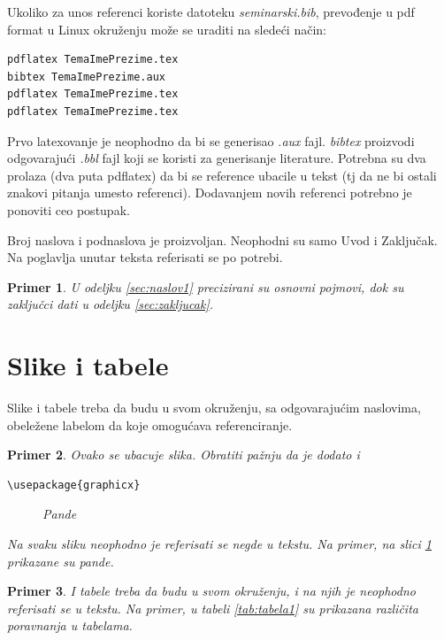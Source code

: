 \documentclass[a4paper]{article}
\newtheorem{primer}{Primer}[section]
\begin{document}
{Ukoliko za unos referenci koriste datoteku {\em seminarski.bib},  prevođenje u pdf format u Linux okruženju može se uraditi na sledeći način:
\begin{verbatim}
pdflatex TemaImePrezime.tex 
bibtex TemaImePrezime.aux 
pdflatex TemaImePrezime.tex 
pdflatex TemaImePrezime.tex 
\end{verbatim}
Prvo latexovanje je neophodno da bi se generisao {\em .aux} fajl. {\em bibtex} proizvodi odgovarajući {\em .bbl} fajl koji se koristi za generisanje literature. 
Potrebna su dva prolaza (dva puta pdflatex) da bi se reference ubacile u tekst (tj da ne bi ostali znakovi pitanja umesto referenci). Dodavanjem novih referenci potrebno je ponoviti ceo postupak.  


Broj naslova i podnaslova je proizvoljan. Neophodni su samo Uvod i Zaključak. Na poglavlja unutar teksta referisati se po potrebi. 
\begin{primer}
U odeljku \ref{sec:naslov1} precizirani su osnovni pojmovi, dok su zaključci dati u odeljku \ref{sec:zakljucak}.
\end{primer}




\section{Slike i tabele}
\label{slike_i_tabele}

Slike i tabele treba da budu u svom okruženju, sa odgovarajućim naslovima, obeležene labelom da koje omogućava referenciranje. 

\begin{primer} Ovako se ubacuje slika. Obratiti pažnju da je dodato i 
\begin{verbatim}
\usepackage{graphicx}
\end{verbatim}

\begin{figure}[h!]
\begin{center}
\end{center}
\caption{Pande}
\label{fig:pande}
\end{figure}

Na svaku sliku neophodno je referisati se negde u tekstu. Na primer, na slici \ref{fig:pande} prikazane su pande. 
\end{primer}

\begin{primer} I tabele treba da budu u svom okruženju, i na njih je neophodno referisati se u tekstu. Na primer, u tabeli \ref{tab:tabela1} su prikazana različita poravnanja u tabelama.


\end{primer}}
\end{document}
